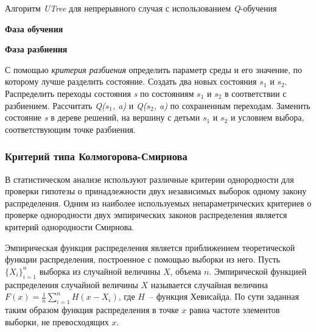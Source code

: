 \begin{algorithm}[h!]
    \caption{Алгоритм \textit{UTree} для непрерывного случая с использованием \textit{Q}-обучения}
    \label{utree_scheme}
    \textbf{Фаза обучения}
    \begin{algorithmic}[1]
    \end{algorithmic}
    \textbf{Фаза разбиения}
    \begin{algorithmic}[1]
            \ENDFOR
            \STATE С помощью \textit{критерия разбиения} определить параметр среды и его значение, по которому лучше разделить состояние.
                \STATE Создать два новых состояния $s_1$ и $s_2$.
                \STATE Распределить переходы состояния \textit{s} по состояниям $s_1$ и $s_2$ в соответствии с  разбиением.
                \STATE Рассчитать \textit{Q($s_1$, a)} и \textit{Q($s_2$, a)} по сохраненным переходам.
                \STATE Заменить состояние \textit{s} в дереве решений, на вершину с детьми $s_1$ и $s_2$ и условием выбора, соответствующим точке разбиения.
            \ENDIF
        \ENDFOR
    \end{algorithmic}
\end{algorithm}

\subsubsection{Критерий типа Колмогорова-Смирнова}
\label{ks_criteria}
В статистическом анализе используют различные критерии однородности для проверки гипотезы о принадлежности двух независимых выборок одному закону распределения. Одним из наиболее используемых непараметрических критериев о проверке однородности двух эмпирических законов распределения является критерий однородности Смирнова.

Эмпирическая функция распределения является приближением теоретической функции распределения, построенное с помощью выборки из него. Пусть $\{X_i\}_{i = 1}^n$ выборка из случайной величины $X$, объема $n$. Эмпирической функцией распределения случайной величины $X$ называется случайная величина $F(x) = \frac{1}{n}\sum\limits_{i = 1}^n{H(x - X_i)}$, где $H$~-- функция Хевисайда. По сути заданная таким образом функция распределения в точке $x$ равна частоте элементов выборки, не превосходящих $x$.

